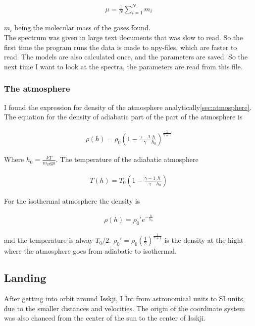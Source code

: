 \documentclass[a4paper, 10pt]{article}
\begin{document}
\begin{align}
\mu = \frac{1}{N}\sum_{i=1}^N m_i
\end{align}

$m_i$ being the molecular mass of the gases found.\\

The spectrum was given in large text documents that was slow to read. So the first time the program runs the data is made to npy-files, which are faster to read. The models are also calculated once, and the parameters are saved. So the next time I want to look at the spectra, the parameters are read from this file. 

\subsubsection{The atmosphere}
I found the expression for density of the atmosphere analytically\ref{sec:atmosphere}. The equation for the density of adiabatic part of the part of the atmosphere is

\begin{align}
\rho (h) = \rho_0 \left(1-\frac{\gamma - 1}{\gamma} \frac{h}{h_0}\right)^{\frac{1}{\gamma - 1}}
\end{align}


Where $h_0 = \frac{kT}{m_H g \mu}$. The temperature of the adiabatic atmosphere

\begin{align}
T(h) = T_0 \left( 1 -\frac{\gamma - 1}{\gamma} \frac{h}{h_0} \right)
\end{align}

For the isothermal atmosphere the density is

\begin{align}
\rho (h) = \rho_0'e^{-\frac{h}{h_0}}
\end{align}

and the temperature is alway $T_0/2$. $\rho_0' = \rho_0 \left( \frac{1}{2} \right) ^{\frac{1}{\gamma + 1}}$ is the density at the hight where the atmosphere goes from adiabatic to isothermal.


\subsection{Landing}
After getting into orbit around Isskji, I Int from astronomical units to SI units, due to the smaller distances and velocities. The origin of the coordinate system was also chanced from the center of the sun to the center of Isskji.
\end{document}
